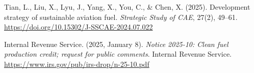 \documentclass[a4paper,11pt]{article}
\begin{document}
\begin{thebibliography}{9}
Tian, L., Liu, X., Lyu, J., Yang, X., You, C., \& Chen, X. (2025). Development strategy of sustainable aviation fuel. \textit{Strategic Study of CAE}, 27(2), 49--61.
\url{https://doi.org/10.15302/J-SSCAE-2024.07.022    }

Internal Revenue Service. (2025, January 8). \textit{Notice 2025-10: Clean fuel production credit; request for public comments}. Internal Revenue Service.
\url{https://www.irs.gov/pub/irs-drop/n-25-10.pdf    }

\end{thebibliography}
\end{document}
